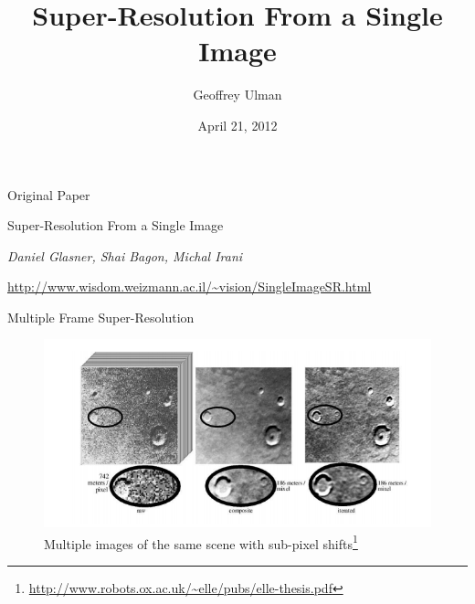 \documentclass{beamer}
\title{Super-Resolution From a Single Image}
\author{Geoffrey Ulman}
\date{April 21, 2012}
\begin{document}

\begin{frame}
\titlepage
\end{frame}


\begin{frame}{Original Paper}

Super-Resolution From a Single Image

\vspace{1cm}

\emph{Daniel Glasner, Shai Bagon, Michal Irani}

\vspace{1cm}

\url{http://www.wisdom.weizmann.ac.il/~vision/SingleImageSR.html}

\end{frame}


\begin{frame}{Multiple Frame Super-Resolution}

\begin{figure}
\centering
\includegraphics[width=1.0\textwidth]{presentation_screen1.png}
\caption{Multiple images of the same scene with sub-pixel shifts\footnote[1]{\url{http://www.robots.ox.ac.uk/~elle/pubs/elle-thesis.pdf}}}
\end{figure}

\end{frame}

\end{document}
